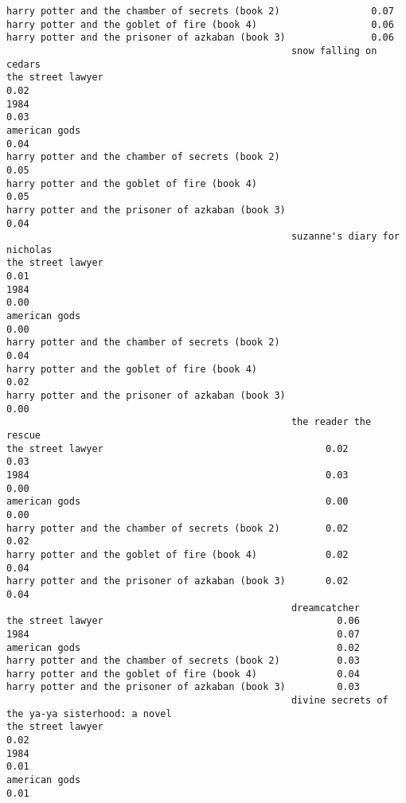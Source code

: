\documentclass[
]{report}
\begin{document}
\begin{verbatim}
harry potter and the chamber of secrets (book 2)                0.07
harry potter and the goblet of fire (book 4)                    0.06
harry potter and the prisoner of azkaban (book 3)               0.06
                                                  snow falling on cedars
the street lawyer                                                   0.02
1984                                                                0.03
american gods                                                       0.04
harry potter and the chamber of secrets (book 2)                    0.05
harry potter and the goblet of fire (book 4)                        0.05
harry potter and the prisoner of azkaban (book 3)                   0.04
                                                  suzanne's diary for nicholas
the street lawyer                                                         0.01
1984                                                                      0.00
american gods                                                             0.00
harry potter and the chamber of secrets (book 2)                          0.04
harry potter and the goblet of fire (book 4)                              0.02
harry potter and the prisoner of azkaban (book 3)                         0.00
                                                  the reader the rescue
the street lawyer                                       0.02       0.03
1984                                                    0.03       0.00
american gods                                           0.00       0.00
harry potter and the chamber of secrets (book 2)        0.02       0.02
harry potter and the goblet of fire (book 4)            0.02       0.04
harry potter and the prisoner of azkaban (book 3)       0.02       0.04
                                                  dreamcatcher
the street lawyer                                         0.06
1984                                                      0.07
american gods                                             0.02
harry potter and the chamber of secrets (book 2)          0.03
harry potter and the goblet of fire (book 4)              0.04
harry potter and the prisoner of azkaban (book 3)         0.03
                                                  divine secrets of the ya-ya sisterhood: a novel
the street lawyer                                                                            0.02
1984                                                                                         0.01
american gods                                                                                0.01

\end{verbatim}
\end{document}
